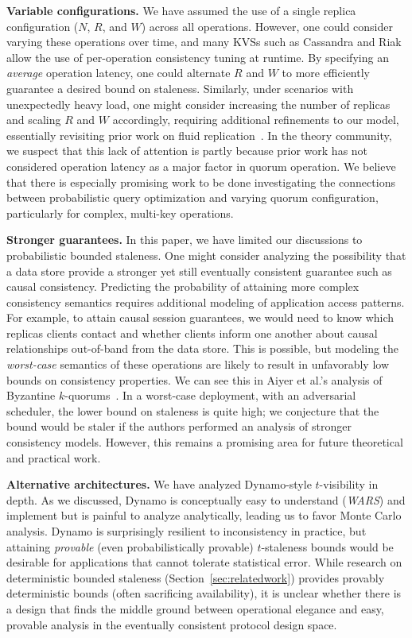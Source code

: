 \documentclass{vldb}
\begin{document}
\textbf{Variable configurations.} We have assumed the use of a single
replica configuration ($N$, $R$, and $W$) across all operations.
However, one could consider varying these operations over time, and
many KVSs such as Cassandra and Riak allow the use of per-operation
consistency tuning at runtime.  By specifying an \textit{average}
operation latency, one could alternate $R$ and $W$ to more efficiently
guarantee a desired bound on staleness.  Similarly, under scenarios
with unexpectedly heavy load, one might consider increasing the number
of replicas and scaling $R$ and $W$ accordingly, requiring additional
refinements to our model, essentially revisiting prior work on fluid
replication~\cite{fluidreplication}.  In the theory community, we
suspect that this lack of attention is partly because prior work has
not considered operation latency as a major factor in quorum
operation.  We believe that there is especially promising work to be
done investigating the connections between probabilistic query
optimization and varying quorum configuration, particularly for
complex, multi-key operations.

\textbf{Stronger guarantees.} In this paper, we have limited our
discussions to probabilistic bounded staleness.  One might consider
analyzing the possibility that a data store provide a stronger yet
still eventually consistent guarantee such as causal consistency.
Predicting the probability of attaining more complex consistency
semantics requires additional modeling of application access patterns.
For example, to attain causal session guarantees, we would need to
know which replicas clients contact and whether clients inform one
another about causal relationships out-of-band from the data store.
This is possible, but modeling the \textit{worst-case} semantics of
these operations are likely to result in unfavorably low bounds on
consistency properties.  We can see this in Aiyer et al.'s analysis of
Byzantine $k$-quorums~\cite{multi-k-quorum}.  In a worst-case
deployment, with an adversarial scheduler, the lower bound on
staleness is quite high; we conjecture that the bound would be staler
if the authors performed an analysis of stronger consistency models.
However, this remains a promising area for future theoretical and
practical work.

\textbf{Alternative architectures.} We have analyzed Dynamo-style
$t$-visibility in depth.  As we discussed, Dynamo is conceptually easy
to understand (\textit{WARS}) and implement but is painful to analyze
analytically, leading us to favor Monte Carlo analysis.  Dynamo is
surprisingly resilient to inconsistency in practice, but attaining
\textit{provable} (even probabilistically provable) $t$-staleness
bounds would be desirable for applications that cannot tolerate
statistical error.  While research on deterministic bounded staleness
(Section~\ref{sec:relatedwork}) provides provably deterministic bounds
(often sacrificing availability), it is unclear whether there is a
design that finds the middle ground between operational elegance and
easy, provable analysis in the eventually consistent protocol design
space.
\end{document}
